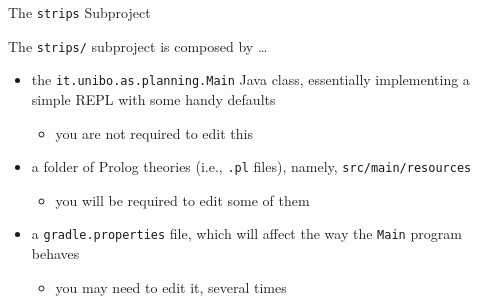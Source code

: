 \documentclass[presentation]{beamer}\mode<presentation>{\usetheme{AMSBolognaFC}}
\begin{document}
\begin{frame}{The \texttt{strips} Subproject}

The \texttt{strips/} subproject is composed by \ldots{}
%
\vfill
%
\begin{itemize}
    \item the \texttt{it.unibo.as.planning.\alert{Main}} Java class, essentially implementing a simple REPL with some handy defaults
    \begin{itemize}
        \item you are not required to edit this
    \end{itemize}

    \vfill

    \item a folder of Prolog theories (i.e., \texttt{.pl} files), namely, \texttt{src/main/\alert{resources}}
    \begin{itemize}
        \item you will be required to edit some of them
    \end{itemize}

    \vfill

    \item a \texttt{gradle\alert{.properties}} file, which will affect the way the \texttt{Main} program behaves
    \begin{itemize}
        \item you may need to edit it, several times
    \end{itemize}
\end{itemize}
\end{frame}
\end{document}
